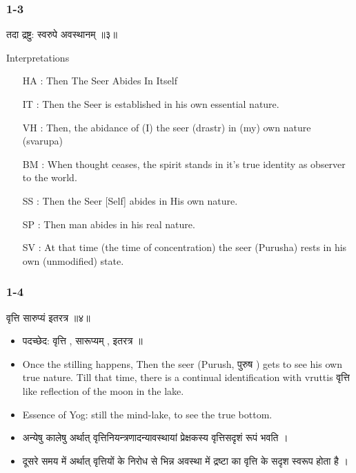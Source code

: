\begin{frame}[fragile]\frametitle{1-3}

\begin{sanskrit}
तदा द्रष्टु: स्वरुपे अवस्थानम् ॥३॥
\end{sanskrit}


Interpretations
\begin{itemize}	
\item [HA]: Then The Seer Abides In Itself
\item [IT]: Then the Seer is established in his own essential nature.
\item [VH]: Then, the abidance of (I) the seer (drastr) in (my) own nature (svarupa)
\item [BM]: When thought ceases, the spirit stands in it’s true identity as observer to the world.
\item [SS]: Then the Seer [Self] abides in His own nature.
\item [SP]: Then man abides in his real nature.
\item [SV]: At that time (the time of concentration) the seer (Purusha) rests in his own (unmodified) state.	
\end{itemize}

\end{frame}

\begin{frame}[fragile]\frametitle{1-4}

\begin{sanskrit}
वृत्ति सारुप्यं इतरत्र ॥४॥
\end{sanskrit}


\begin{itemize}
\item पदच्छेद: वृत्ति , सारूप्यम् , इतरत्र ॥
\item Once the stilling happens, Then the seer (Purush, पुरुष ) gets to see his own true nature. Till that time, there is a continual identification with vruttis वृत्ति like reflection of the moon in the lake.
\item Essence of Yog: still the mind-lake, to see the true bottom.
\item अन्येषु कालेषु अर्थात् वृत्तिनियन्त्रणादन्यावस्थायां प्रेक्षकस्य वृत्तिसदृशं रूपं भवति ।
\item दूसरे समय में अर्थात् वृत्तियों के निरोध से भिन्न अवस्था में द्रष्टा का वृत्ति के सदृश स्वरूप होता है ।
\end{itemize}

\end{frame}

